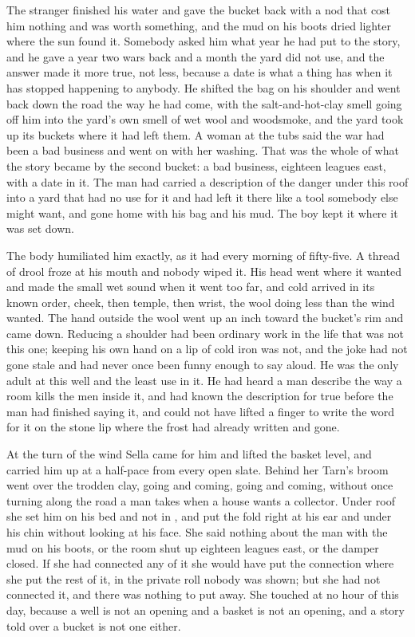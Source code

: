 The stranger finished his water and gave the bucket back with a nod that cost him nothing and was worth something, and the mud on his boots dried lighter where the sun found it. Somebody asked him what year he had put to the story, and he gave a year two wars back and a month the yard did not use, and the answer made it more true, not less, because a date is what a thing has when it has stopped happening to anybody. He shifted the bag on his shoulder and went back down the road the way he had come, with the salt-and-hot-clay smell going off him into the yard's own smell of wet wool and woodsmoke, and the yard took up its buckets where it had left them. A woman at the tubs said the war had been a bad business and went on with her washing. That was the whole of what the story became by the second bucket: a bad business, eighteen leagues east, with a date in it. The man had carried a description of the danger under this roof into a yard that had no use for it and had left it there like a tool somebody else might want, and gone home with his bag and his mud. The boy kept it where it was set down.

The body humiliated him exactly, as it had every morning of fifty-five. A thread of drool froze at his mouth and nobody wiped it. His head went where it wanted and made the small wet sound when it went too far, and cold arrived in its known order, cheek, then temple, then wrist, the wool doing less than the wind wanted. The hand outside the wool went up an inch toward the bucket's rim and came down. Reducing a shoulder had been ordinary work in the life that was not this one; keeping his own hand on a lip of cold iron was not, and the joke had not gone stale and had never once been funny enough to say aloud. He was the only adult at this well and the least use in it. He had heard a man describe the way a room kills the men inside it, and had known the description for true before the man had finished saying it, and could not have lifted a finger to write the word for it on the stone lip where the frost had already written and gone.

\scenebreak

At the turn of the wind Sella came for him and lifted the basket level, and carried him up  at a half-pace from every open slate. Behind her Tarn's broom went over the trodden clay, going and coming, going and coming, without once turning along the road a man takes when a house wants a collector. Under  roof she set him on his bed and not in , and put the fold right at his ear and under his chin without looking at his face. She said nothing about the man with the mud on his boots, or the room shut up eighteen leagues east, or the damper closed. If she had connected any of it she would have put the connection where she put the rest of it, in the private roll nobody was shown; but she had not connected it, and there was nothing to put away. She touched  at no hour of this day, because a well is not an opening and a basket is not an opening, and a story told over a bucket is not one either.

